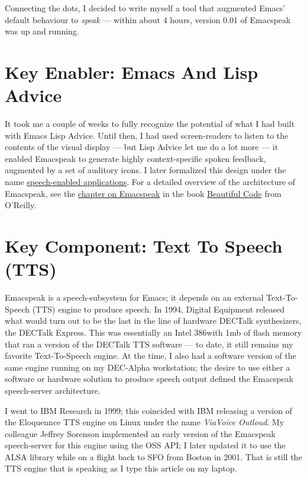 \documentclass[11pt]{article}
\begin{document}
Connecting the dots, I decided to write myself a tool that
augmented Emacs' default behaviour to \emph{speak}   —   within about 4
hours, version 0.01 of Emacspeak was up and running.


\section{Key Enabler: Emacs And Lisp Advice}
\label{sec-3}

It took me a couple of weeks to fully recognize the potential of
what I had built with Emacs Lisp Advice. Until then, I had used
screen-readers to listen to the contents of the visual display
  —   but Lisp Advice let me do a lot more   —   it enabled Emacspeak
to generate highly context-specific spoken feedback, augmented by
a set of auditory icons. I later formalized this design under the
name \href{http://en.wikipedia.org/wiki/Self-voicing}{speech-enabled applications}. For a detailed overview of the
architecture of Emacspeak, see the \href{http://emacspeak.sourceforge.net/raman/publications/bc-emacspeak/publish-emacspeak-bc.html}{chapter on Emacspeak} in the
book \href{http://emacspeak.blogspot.com/2007/07/emacspeak-and-beautiful-code.html}{Beautiful Code} from O'Reilly.

\section{Key Component: Text To Speech (TTS)}
\label{sec-4}

Emacspeak is a speech-subsystem for Emacs; it depends on an
external Text-To-Speech (TTS) engine to produce speech. In 1994,
Digital Equipment released what would turn out to be the last in
the line of hardware DECTalk synthesizers, the DECTalk
Express. This was essentially an Intel 386with 1mb of flash
memory that ran a version of the DECTalk TTS software   —   to
date, it still remains my favorite Text-To-Speech engine.
At the time,  I also had a software version of the same engine
running on my DEC-Alpha workstation;  the desire to use either a
software or hardware solution to produce speech output defined
the Emacspeak speech-server architecture.

I went to IBM Research in 1999; this coincided with IBM releasing
a version of the Eloquennce TTS engine on Linux under the name
\emph{ViaVoice Outloud}. My colleague Jeffrey Sorenson implemented an
early version of the Emacspeak speech-server for this engine using
the OSS API; I later updated it to use the ALSA library while on
a flight back to SFO from Boston in 2001. That is still the TTS
engine that is speaking as I type this article on my laptop. 
\end{document}

